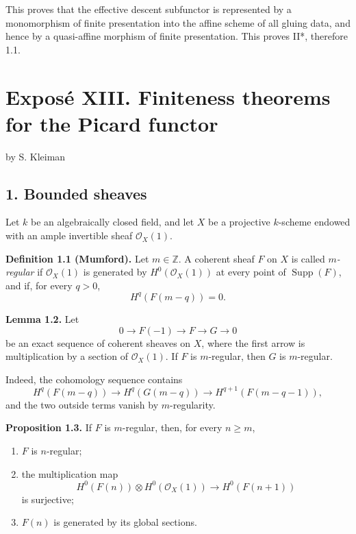 \documentclass[11pt]{article}
\begin{document}
This proves that the effective descent subfunctor is represented by a monomorphism of finite presentation into the affine scheme of all gluing data, and hence by a quasi-affine morphism of finite presentation. This proves II*, therefore 1.1.



\providecommand{\Ass}{\operatorname{Ass}}
\providecommand{\Hom}{\operatorname{Hom}}
\providecommand{\Ext}{\operatorname{Ext}}
\providecommand{\Proj}{\operatorname{Proj}}
\providecommand{\NS}{\operatorname{NS}}
\providecommand{\Tors}{\operatorname{Tors}}
\providecommand{\Picnum}{\operatorname{Pic}^{\mathrm{num}}}
\providecommand{\Piczero}{\operatorname{Pic}^{0}}
\providecommand{\Pictau}{\operatorname{Pic}^{\tau}}
\providecommand{\length}{\operatorname{length}}


\section*{Expos\'e XIII. Finiteness theorems for the Picard functor}
\begin{center}
by S. Kleiman
\end{center}

\subsection*{1. Bounded sheaves}
Let $k$ be an algebraically closed field, and let $X$ be a projective $k$-scheme endowed with an ample invertible sheaf $\mathcal O_X(1)$.

\textbf{Definition 1.1 (Mumford).} Let $m\in\mathbb Z$. A coherent sheaf $F$ on $X$ is called \emph{$m$-regular} if $\mathcal O_X(1)$ is generated by $H^0(\mathcal O_X(1))$ at every point of $\operatorname{Supp}(F)$, and if, for every $q>0$,
\[
 H^q(F(m-q))=0.
\]

\textbf{Lemma 1.2.} Let
\[
0\longrightarrow F(-1)\longrightarrow F\longrightarrow G\longrightarrow 0
\]
be an exact sequence of coherent sheaves on $X$, where the first arrow is multiplication by a section of $\mathcal O_X(1)$. If $F$ is $m$-regular, then $G$ is $m$-regular.

Indeed, the cohomology sequence contains
\[
H^q(F(m-q))\longrightarrow H^q(G(m-q))\longrightarrow H^{q+1}(F(m-q-1)),
\]
and the two outside terms vanish by $m$-regularity.

\textbf{Proposition 1.3.} If $F$ is $m$-regular, then, for every $n\geq m$,
\begin{enumerate}[label=\roman*)]
\item $F$ is $n$-regular;
\item the multiplication map
\[
 H^0(F(n))\otimes H^0(\mathcal O_X(1))\longrightarrow H^0(F(n+1))
\]
is surjective;
\item $F(n)$ is generated by its global sections.
\end{enumerate}
\end{document}
